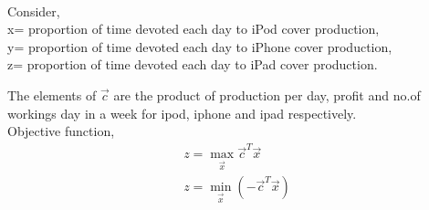 \documentclass[journal,12pt,twocolumn]{IEEEtran}
\begin{document}
\begin{enumerate}
\solution \\
Consider,\\
x= proportion of time devoted each day to iPod cover production,\\
y= proportion of time devoted each day to iPhone cover production,\\
z= proportion of time devoted each day to iPad cover production.\\
\begin{table}[H]
 \centering
 \caption{}
 \end{table}
 The elements of $ \vec{c}$ are the product of production per day, profit and no.of workings day in a week for ipod, iphone and ipad respectively.\\
Objective function,
\begin{align}
z = \max_\vec{x} \vec{c}^T\vec{x}\\
z = \min_\vec{x} (- \vec{c}^T\vec{x})
\end{align}

\end{enumerate}
\end{document}
